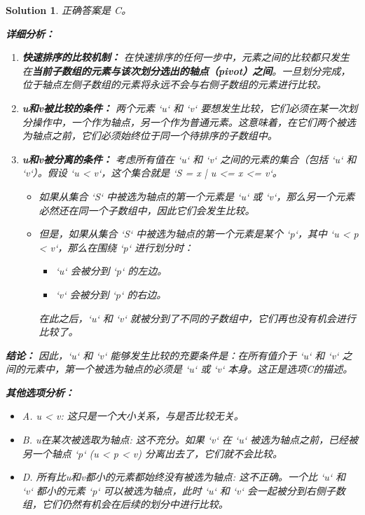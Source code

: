 \documentclass[UTF8]{report}
\newtheorem{solution}{Solution}
\theoremstyle{MyLineTheoremStyle} %
\theoremstyle{MyBlockTheoremStyle} %
\theoremstyle{MySubsubsectionStyle} %
\begin{document}
\begin{solution}
正确答案是 C。

\textbf{详细分析：}

\begin{enumerate}
    \item \textbf{快速排序的比较机制：}
    在快速排序的任何一步中，元素之间的比较都只发生在\textbf{当前子数组的元素与该次划分选出的轴点（pivot）之间}。一旦划分完成，位于轴点左侧子数组的元素将永远不会与右侧子数组的元素进行比较。

    \item \textbf{u和v被比较的条件：}
    两个元素 `u` 和 `v` 要想发生比较，它们必须在某一次划分操作中，一个作为轴点，另一个作为普通元素。这意味着，在它们两个被选为轴点之前，它们必须始终位于同一个待排序的子数组中。

    \item \textbf{u和v被分离的条件：}
    考虑所有值在 `u` 和 `v` 之间的元素的集合（包括 `u` 和 `v`）。假设 `u < v`，这个集合就是 `S = {x | u <= x <= v}`。
    \begin{itemize}
        \item 如果从集合 `S` 中被选为轴点的第一个元素是 `u` 或 `v`，那么另一个元素必然还在同一个子数组中，因此它们会发生比较。
        \item 但是，如果从集合 `S` 中被选为轴点的第一个元素是某个 `p`，其中 `u < p < v`，那么在围绕 `p` 进行划分时：
        \begin{itemize}
            \item `u` 会被分到 `p` 的左边。
            \item `v` 会被分到 `p` 的右边。
        \end{itemize}
        在此之后，`u` 和 `v` 就被分到了不同的子数组中，它们再也没有机会进行比较了。
    \end{itemize}
\end{enumerate}

\textbf{结论：}
因此，`u` 和 `v` 能够发生比较的充要条件是：在所有值介于 `u` 和 `v` 之间的元素中，第一个被选为轴点的必须是 `u` 或 `v` 本身。这正是选项C的描述。

\textbf{其他选项分析：}
\begin{itemize}
    \item A. u < v: 这只是一个大小关系，与是否比较无关。
    \item B. u在某次被选取为轴点: 这不充分。如果 `v` 在 `u` 被选为轴点之前，已经被另一个轴点 `p` (u < p < v) 分离出去了，它们就不会比较。
    \item D. 所有比u和v都小的元素都始终没有被选为轴点: 这不正确。一个比 `u` 和 `v` 都小的元素 `p` 可以被选为轴点，此时 `u` 和 `v` 会一起被分到右侧子数组，它们仍然有机会在后续的划分中进行比较。
\end{itemize}
\end{solution}
\end{document}
